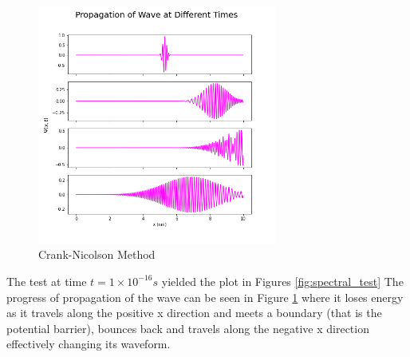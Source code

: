 \documentclass[11pt]{article}
\begin{document}
	\begin{figure}[!h]\begin{center} 
			\vspace{12pt}
			\includegraphics[width=0.7\textwidth]{cn_wave.png}
			\caption{Crank-Nicolson Method}
			\label{fig:cn} 
		\end{center}
	\end{figure} 

	
	 The test at time $t = 1 \times 10^{-16} s$ yielded the plot in Figures  \ref{fig:spectral_test}  The progress of  propagation of the wave can be seen in Figure \ref{fig:cn} where it loses energy as it travels along the positive x direction and meets a boundary (that is the potential barrier), bounces back and travels along the negative x direction effectively changing its waveform. 
	
	
	
	
\end{document}
